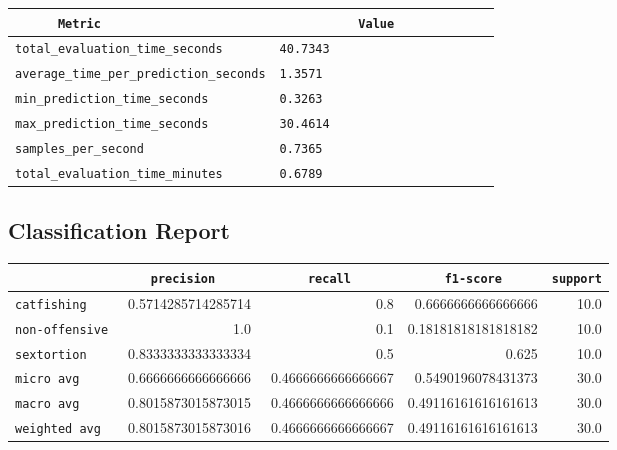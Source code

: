 \documentclass{article}
\begin{document}
\begin{center}
\begin{tabular}{l | l} \hline
    \verb|      Metric     | & \verb|           Value           | \\ \hline
    \hline
    \verb|total_evaluation_time_seconds| & \verb|40.7343                      | \\ \hline
    \verb|average_time_per_prediction_seconds| & \verb|1.3571                       | \\ \hline
    \verb|min_prediction_time_seconds| & \verb|0.3263                       | \\ \hline
    \verb|max_prediction_time_seconds| & \verb|30.4614                      | \\ \hline
    \verb|samples_per_second| & \verb|0.7365                       | \\ \hline
    \verb|total_evaluation_time_minutes| & \verb|0.6789                       | \\ \hline
\end{tabular}
\end{center}

\subsection{Classification Report}

\begin{center}
\begin{tabular}{l | r | r | r | r} \hline
    \verb|            | & \verb|    precision     | & \verb|      recall      | & \verb|     f1-score     | & \verb|support| \\ \hline
    \hline
    \verb|catfishing | & 0.5714285714285714 & 0.8 & 0.6666666666666666 &    10.0 \\ \hline
    \verb|non-offensive| & 1.0 & 0.1 & 0.18181818181818182 &    10.0 \\ \hline
    \verb|sextortion | & 0.8333333333333334 & 0.5 & 0.625 &    10.0 \\ \hline
    \verb|micro avg  | & 0.6666666666666666 & 0.4666666666666667 & 0.5490196078431373 &    30.0 \\ \hline
    \verb|macro avg  | & 0.8015873015873015 & 0.4666666666666666 & 0.49116161616161613 &    30.0 \\ \hline
    \verb|weighted avg| & 0.8015873015873016 & 0.4666666666666667 & 0.49116161616161613 &    30.0 \\ \hline
\end{tabular}
\end{center}
\end{document}

